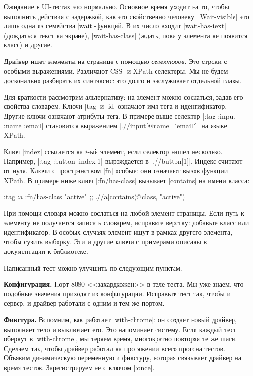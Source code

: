 Ожидание в UI-тестах это нормально. Основное время уходит на то, чтобы выполнить
действия с задержкой, как это свойственно человеку. \spverb|Wait-visible| это
лишь одна из семейства \spverb|wait|-функций. В их число входит
\spverb|wait-has-text| (дождаться текст на экране), \spverb|wait-has-class|
(ждать, пока у элемента не появится класс) и другие.

Драйвер ищет элементы на странице с помощью \emph{селекторов}. Это строки с
особыми выражениями. Различают CSS- и XPath-селекторы. Мы не будем досконально
разбирать их синтаксис: это долго и заслуживает отдельной главы.

Для краткости рассмотрим альтернативу: на элемент можно сослаться, задав его
свойства словарем. Ключи \spverb|tag| и \spverb|id| означают имя тега и
идентификатор. Другие ключи означают атрибуты тега. В примере выше селектор
\spverb|{:tag :input :name :email}| становится выражением
\spverb|.//input[@name="email"]| на языке XPath.

Ключ \spverb|index| ссылается на $i$-ый элемент, если селектор нашел
несколько. Например, \spverb|{:tag :button :index 1}| вырождается в
\spverb|.//button[1]|. Индекс считают от нуля. Ключи с пространством \spverb|fn|
особые: они означают вызов функции XPath. В примере ниже ключ
\spverb|:fn/has-class| вызывает \spverb|contains| на имени класса:

\begin{english}
  \begin{clojure}
{:tag :a :fn/has-class "active"}
;; .//a[contains(@class, "active")]
  \end{clojure}
\end{english}

При помощи словаря можно сослаться на любой элемент страницы. Если путь к
элементу не получается записать словарем, исправьте верстку: добавьте класс или
идентификатор. В особых случаях элемент ищут в рамках другого элемента, чтобы
сузить выборку. Эти и другие ключи с примерами описаны в документации к
библиотеке.

Написанный тест можно улучшить по следующим пунктам.

\textbf{Конфигурация.} Порт 8080 <<захардкожен>> в теле теста. Мы уже знаем, что
подобные значения приходят из конфигурации. Исправьте тест так, чтобы и сервер,
и драйвер работали с одним и тем же портом.

\textbf{Фикстура.} Вспомним, как работает \spverb|with-chrome|: он создает новый
драйвер, выполняет тело и выключает его. Это напоминает систему. Если каждый
тест обернут в \spverb|with-chrome|, мы теряем время, многократно повторяя те же
шаги. Сделаем так, чтобы драйвер работал на протяжении всего прогона
тестов. Объявим динамическую переменную и фикстуру, которая связывает драйвер на
время тестов. Зарегистрируем ее с ключом \spverb|:once|.


